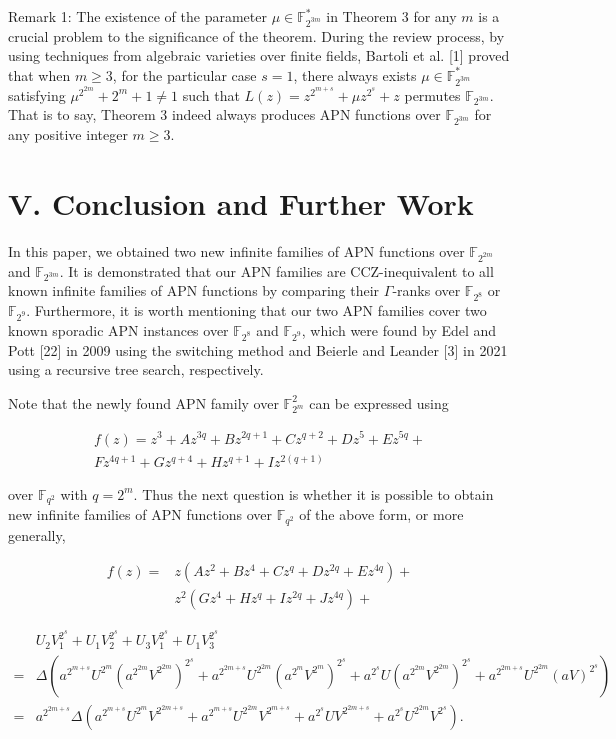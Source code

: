 \documentclass[10pt]{article}
\begin{document}
Remark 1: The existence of the parameter $\mu \in \mathbb{F}_{2^{3 m}}^{*}$ in Theorem 3 for any $m$ is a crucial problem to the significance of the theorem. During the review process, by using techniques from algebraic varieties over finite fields, Bartoli et al. [1] proved that when $m \geq 3$, for the particular case $s=1$, there always exists $\mu \in \mathbb{F}_{2^{3 m}}^{*}$ satisfying $\mu^{2^{2 m}}+2^{m}+1 \neq 1$ such that $L(z)=z^{2^{m+s}}+\mu z^{2^{s}}+z$ permutes $\mathbb{F}_{2^{3 m}}$. That is to say, Theorem 3 indeed always produces APN functions over $\mathbb{F}_{2^{3 m}}$ for any positive integer $m \geq 3$.

\section*{V. Conclusion and Further Work}
In this paper, we obtained two new infinite families of APN functions over $\mathbb{F}_{2^{2 m}}$ and $\mathbb{F}_{2^{3 m}}$. It is demonstrated that our APN families are CCZ-inequivalent to all known infinite families of APN functions by comparing their $\Gamma$-ranks over $\mathbb{F}_{2^{8}}$ or $\mathbb{F}_{2^{9}}$. Furthermore, it is worth mentioning that our two APN families cover two known sporadic APN instances over $\mathbb{F}_{2^{8}}$ and $\mathbb{F}_{2^{9}}$, which were found by Edel and Pott [22] in 2009 using the switching method and Beierle and Leander [3] in 2021 using a recursive tree search, respectively.

Note that the newly found APN family over $\mathbb{F}_{2^{m}}^{2}$ can be expressed using

$$
\begin{gathered}
f(z)=z^{3}+A z^{3 q}+B z^{2 q+1}+C z^{q+2}+D z^{5}+E z^{5 q}+ \\
F z^{4 q+1}+G z^{q+4}+H z^{q+1}+I z^{2(q+1)}
\end{gathered}
$$

over $\mathbb{F}_{q^{2}}$ with $q=2^{m}$. Thus the next question is whether it is possible to obtain new infinite families of APN functions over $\mathbb{F}_{q^{2}}$ of the above form, or more generally,

$$
\begin{aligned}
f(z)= & z\left(A z^{2}+B z^{4}+C z^{q}+D z^{2 q}+E z^{4 q}\right)+ \\
& z^{2}\left(G z^{4}+H z^{q}+I z^{2 q}+J z^{4 q}\right)+
\end{aligned}
$$

$$
\begin{aligned}
& U_{2} V_{1}^{2^{s}}+U_{1} V_{2}^{2^{s}}+U_{3} V_{1}^{2^{s}}+U_{1} V_{3}^{2^{s}} \\
= & \Delta\left(a^{2^{m+s}} U^{2^{m}}\left(a^{2^{2 m}} V^{2^{2 m}}\right)^{2^{s}}+a^{2^{2 m+s}} U^{2^{2 m}}\left(a^{2^{m}} V^{2^{m}}\right)^{2^{s}}+a^{2^{s}} U\left(a^{2^{2 m}} V^{2^{2 m}}\right)^{2^{s}}+a^{2^{2 m+s}} U^{2^{2 m}}(a V)^{2^{s}}\right) \\
= & a^{2^{2 m+s}} \Delta\left(a^{2^{m+s}} U^{2^{m}} V^{2^{2 m+s}}+a^{2^{m+s}} U^{2^{2 m}} V^{2^{m+s}}+a^{2^{s}} U V^{2^{2 m+s}}+a^{2^{s}} U^{2^{2 m}} V^{2^{s}}\right) .
\end{aligned}
$$
\end{document}
